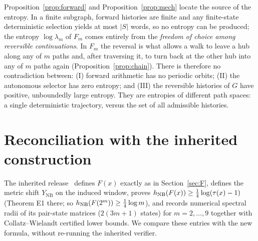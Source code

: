 Proposition~\ref{prop:forward} and Proposition~\ref{prop:mech} locate the source of the entropy. In a finite subgraph, forward histories are finite and any finite-state deterministic selection yields at most $|S|$ words, so no entropy can be produced; the entropy $\log\lambda_m$ of $F_m$ comes entirely from the \emph{freedom of choice among reversible continuations}. In $F_m$ the reversal is what allows a walk to leave a hub along any of $m$ paths and, after traversing it, to turn back at the other hub into any of $m$ paths again (Proposition~\ref{prop:chain}). There is therefore no contradiction between: (I) forward arithmetic has no periodic orbits; (II) the autonomous selector has zero entropy; and (III) the reversible histories of $G$ have positive, unboundedly large entropy. They are entropies of different path spaces: a single deterministic trajectory, versus the set of all admissible histories.

\begin{table}[H]
\centering\small
{}
\caption{The three dynamics compared.}
\end{table}

\section{Reconciliation with the inherited construction}\label{sec:recon}

The inherited release~\cite{UENT} defines $F(x)$ exactly as in Section~\ref{sec:F}, defines the metric shift $Y_{\mathrm{NB}}$ on the induced window, proves $h_{\mathrm{NB}}(F(x))\ge\tfrac14\log(\tau(x)-1)$ (Theorem E1 there; so $h_{\mathrm{NB}}(F(2^m))\ge\tfrac14\log m$), and records numerical spectral radii of its pair-state matrices ($2(3m+1)$ states) for $m=2,\dots,9$ together with Collatz--Wielandt certified lower bounds. We compare these entries with the new formula, without re-running the inherited verifier.


